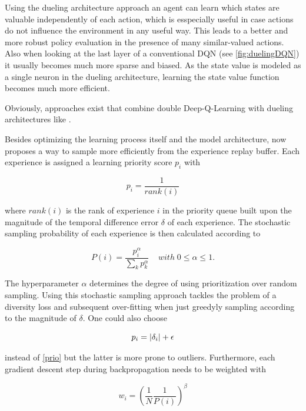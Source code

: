 Using the dueling architecture approach an agent can learn which states are valuable independently of each action, which is esspecially useful in case actions do not influence the environment in any useful way. This leads to a better and more robust policy evaluation in the presence of many similar-valued actions. Also when looking at the last layer of a conventional DQN (see \autoref{fig:duelingDQN}) it usually becomes much more sparse and biased. As the state value is modeled as a single neuron in the dueling architecture, learning the state value function becomes much more efficient. 

Obviously, approaches exist that combine double Deep-Q-Learning with dueling architectures like \cite{Huang2018}. 

Besides optimizing the learning process itself and the model architecture, \cite{Schaul2016} now proposes a way to sample more efficiently from the experience replay buffer. Each experience is assigned a learning priority score $p_i$ with 

\begin{equation} \label{prio}
	p_i = \frac{1}{rank(i)}
\end{equation}

where $rank(i)$ is the rank of experience $i$ in the priority queue built upon the magnitude of the temporal difference error $\delta$ of each experience. The stochastic sampling probability of each experience is then calculated according to 

\begin{equation} \label{prob}
	P(i) = \frac{p_i^{\alpha}}{\sum_k p_k^{\alpha}} \;\;\;\; with \; 0\le\alpha\le1.
\end{equation}

The hyperparameter $\alpha$ determines the degree of using prioritization over random sampling. Using this stochastic sampling approach tackles the problem of a diversity loss and subsequent over-fitting when just greedyly sampling according to the magnitude of $\delta$. One could also choose 

\begin{equation} \label{prio2}
	p_i = \lvert\delta_i\rvert + \epsilon
\end{equation}

instead of \ref{prio} but the latter is more prone to outliers. Furthermore, each gradient descent step during backpropagation needs to be weighted with 

\begin{equation} \label{weight}
	w_i = ( \frac{1}{N} \frac{1}{P(i)} )^\beta
\end{equation}

